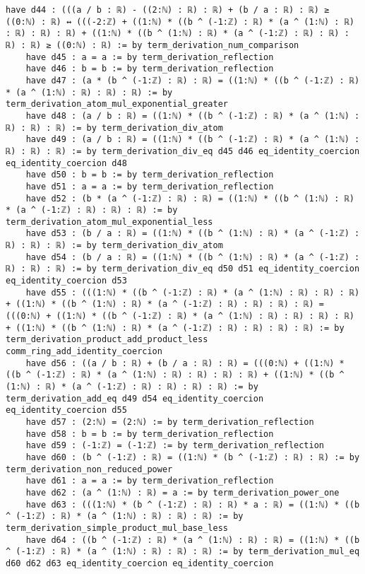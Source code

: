 \documentclass{article}
\begin{document}
\begin{tcolorbox}[colback=white!10, width=\linewidth]
\begin{lstlisting}[language=Lean4]
    have d44 : (((a / b : ℝ) - ((2:ℕ) : ℝ) : ℝ) + (b / a : ℝ) : ℝ) ≥ ((0:ℕ) : ℝ) ↔ (((-2:ℤ) + ((1:ℕ) * ((b ^ (-1:ℤ) : ℝ) * (a ^ (1:ℕ) : ℝ) : ℝ) : ℝ) : ℝ) + ((1:ℕ) * ((b ^ (1:ℕ) : ℝ) * (a ^ (-1:ℤ) : ℝ) : ℝ) : ℝ) : ℝ) ≥ ((0:ℕ) : ℝ) := by term_derivation_num_comparison
    have d45 : a = a := by term_derivation_reflection
    have d46 : b = b := by term_derivation_reflection
    have d47 : (a * (b ^ (-1:ℤ) : ℝ) : ℝ) = ((1:ℕ) * ((b ^ (-1:ℤ) : ℝ) * (a ^ (1:ℕ) : ℝ) : ℝ) : ℝ) := by term_derivation_atom_mul_exponential_greater
    have d48 : (a / b : ℝ) = ((1:ℕ) * ((b ^ (-1:ℤ) : ℝ) * (a ^ (1:ℕ) : ℝ) : ℝ) : ℝ) := by term_derivation_div_atom
    have d49 : (a / b : ℝ) = ((1:ℕ) * ((b ^ (-1:ℤ) : ℝ) * (a ^ (1:ℕ) : ℝ) : ℝ) : ℝ) := by term_derivation_div_eq d45 d46 eq_identity_coercion eq_identity_coercion d48
    have d50 : b = b := by term_derivation_reflection
    have d51 : a = a := by term_derivation_reflection
    have d52 : (b * (a ^ (-1:ℤ) : ℝ) : ℝ) = ((1:ℕ) * ((b ^ (1:ℕ) : ℝ) * (a ^ (-1:ℤ) : ℝ) : ℝ) : ℝ) := by term_derivation_atom_mul_exponential_less
    have d53 : (b / a : ℝ) = ((1:ℕ) * ((b ^ (1:ℕ) : ℝ) * (a ^ (-1:ℤ) : ℝ) : ℝ) : ℝ) := by term_derivation_div_atom
    have d54 : (b / a : ℝ) = ((1:ℕ) * ((b ^ (1:ℕ) : ℝ) * (a ^ (-1:ℤ) : ℝ) : ℝ) : ℝ) := by term_derivation_div_eq d50 d51 eq_identity_coercion eq_identity_coercion d53
    have d55 : (((1:ℕ) * ((b ^ (-1:ℤ) : ℝ) * (a ^ (1:ℕ) : ℝ) : ℝ) : ℝ) + ((1:ℕ) * ((b ^ (1:ℕ) : ℝ) * (a ^ (-1:ℤ) : ℝ) : ℝ) : ℝ) : ℝ) = (((0:ℕ) + ((1:ℕ) * ((b ^ (-1:ℤ) : ℝ) * (a ^ (1:ℕ) : ℝ) : ℝ) : ℝ) : ℝ) + ((1:ℕ) * ((b ^ (1:ℕ) : ℝ) * (a ^ (-1:ℤ) : ℝ) : ℝ) : ℝ) : ℝ) := by term_derivation_product_add_product_less comm_ring_add_identity_coercion
    have d56 : ((a / b : ℝ) + (b / a : ℝ) : ℝ) = (((0:ℕ) + ((1:ℕ) * ((b ^ (-1:ℤ) : ℝ) * (a ^ (1:ℕ) : ℝ) : ℝ) : ℝ) : ℝ) + ((1:ℕ) * ((b ^ (1:ℕ) : ℝ) * (a ^ (-1:ℤ) : ℝ) : ℝ) : ℝ) : ℝ) := by term_derivation_add_eq d49 d54 eq_identity_coercion eq_identity_coercion d55
    have d57 : (2:ℕ) = (2:ℕ) := by term_derivation_reflection
    have d58 : b = b := by term_derivation_reflection
    have d59 : (-1:ℤ) = (-1:ℤ) := by term_derivation_reflection
    have d60 : (b ^ (-1:ℤ) : ℝ) = ((1:ℕ) * (b ^ (-1:ℤ) : ℝ) : ℝ) := by term_derivation_non_reduced_power
    have d61 : a = a := by term_derivation_reflection
    have d62 : (a ^ (1:ℕ) : ℝ) = a := by term_derivation_power_one
    have d63 : (((1:ℕ) * (b ^ (-1:ℤ) : ℝ) : ℝ) * a : ℝ) = ((1:ℕ) * ((b ^ (-1:ℤ) : ℝ) * (a ^ (1:ℕ) : ℝ) : ℝ) : ℝ) := by term_derivation_simple_product_mul_base_less
    have d64 : ((b ^ (-1:ℤ) : ℝ) * (a ^ (1:ℕ) : ℝ) : ℝ) = ((1:ℕ) * ((b ^ (-1:ℤ) : ℝ) * (a ^ (1:ℕ) : ℝ) : ℝ) : ℝ) := by term_derivation_mul_eq d60 d62 d63 eq_identity_coercion eq_identity_coercion

\end{lstlisting}
\end{tcolorbox}
\end{document}
